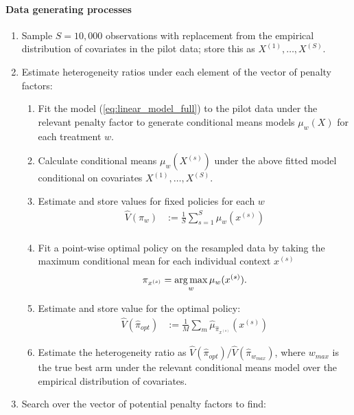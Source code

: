 \documentclass[letterpaper, 12pt, parskip=full,]{scrartcl}
\begin{document}
\paragraph{Data generating processes}
\begin{enumerate}
\item  Sample $S=10,000$ observations with replacement from the empirical distribution of covariates in the pilot data; store this as $X^{(1)}, \dots,X^{(S)}$. 
\item Estimate heterogeneity ratios under each element of the vector of penalty factors:
\begin{enumerate}
\item Fit the model (\ref{eq:linear_model_full}) to the pilot data under the relevant penalty factor to generate conditional means models $\mu_{w}(X)$ for each treatment $w$.
  \item Calculate conditional means $\mu_{w}(X^{(s)})$ under the above fitted model conditional on covariates $X^{(1)}, \dots,X^{(S)}$. 
  \item Estimate and store values for fixed policies for each $w$
      \begin{align}
          \hat{V}({\pi}_{w})  &:= \frac{1}{S} \sum_{s = 1}^S \mu_{w}(x^{(s)}) \\
          \end{align}
  \item Fit a point-wise optimal policy on the resampled data by taking the maximum conditional mean for each individual context $x^{(s)}$ 
    \begin{equation}
     \pi_{x^{(s)}} = \operatorname*{arg\,max}_{ w } \mu_{w}(x^{(s)}) . 
    \end{equation} 
    \item Estimate and store value for the optimal policy:
    \begin{align}
      \hat{V}(\hat{\pi}_{opt})  &:= \frac{1}{M} \sum_m \hat{\mu}_{\hat{\pi}_{x^{(s)}}}(x^{(s)}) 
          \end{align}
  \item Estimate the heterogeneity ratio as $\hat{V}(\hat{\pi}_{opt})/\hat{V}(\hat{\pi}_{w_{max}})$, where $w_{max}$ is the true best arm under the relevant conditional means model over the empirical distribution of covariates. 
\end{enumerate}
\item Search over the vector of potential penalty factors to find:

\end{enumerate}
\end{document}
